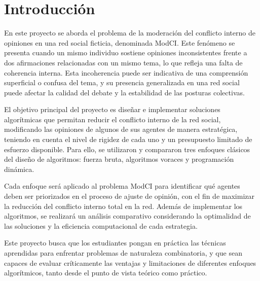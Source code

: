 \documentclass[11pt,letter]{article}
\begin{document}
    \newpage



    \section{Introducción}

    En este proyecto se aborda el problema de la moderación del conflicto interno de opiniones en una red social ficticia, denominada ModCI. Este fenómeno se presenta cuando un mismo individuo sostiene opiniones inconsistentes frente a dos afirmaciones relacionadas con un mismo tema, lo que refleja una falta de coherencia interna. Esta incoherencia puede ser indicativa de una comprensión superficial o confusa del tema, y su presencia generalizada en una red social puede afectar la calidad del debate y la estabilidad de las posturas colectivas.
    \par\vspace{0.5cm}
    El objetivo principal del proyecto es diseñar e implementar soluciones algorítmicas que permitan reducir el conflicto interno de la red social, modificando las opiniones de algunos de sus agentes de manera estratégica, teniendo en cuenta el nivel de rigidez de cada uno y un presupuesto limitado de esfuerzo disponible. Para ello, se utilizaron y compararon tres enfoques clásicos del diseño de algoritmos: fuerza bruta, algoritmos voraces y programación dinámica.
    \par\vspace{0.5cm}
    Cada enfoque será aplicado al problema ModCI para identificar qué agentes deben ser priorizados en el proceso de ajuste de opinión, con el fin de maximizar la reducción del conflicto interno total en la red. Además de implementar los algoritmos, se realizará un análisis comparativo considerando la optimalidad de las soluciones y la eficiencia computacional de cada estrategia.
    \par\vspace{0.5cm}
    Este proyecto busca que los estudiantes pongan en práctica las técnicas aprendidas para enfrentar problemas de naturaleza combinatoria, y que sean capaces de evaluar críticamente las ventajas y limitaciones de diferentes enfoques algorítmicos, tanto desde el punto de vista teórico como práctico.

    \newpage

\end{document}
